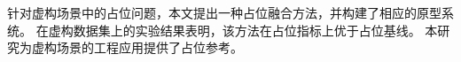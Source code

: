 \documentclass{thuthesis}
\author{测试作者} %
\begin{document}
\begin{cabstract}
针对虚构场景中的占位问题，本文提出一种占位融合方法，并构建了相应的原型系统。
在虚构数据集上的实验结果表明，该方法在占位指标上优于占位基线。
本研究为虚构场景的工程应用提供了占位参考。
\end{cabstract}












\end{document}
